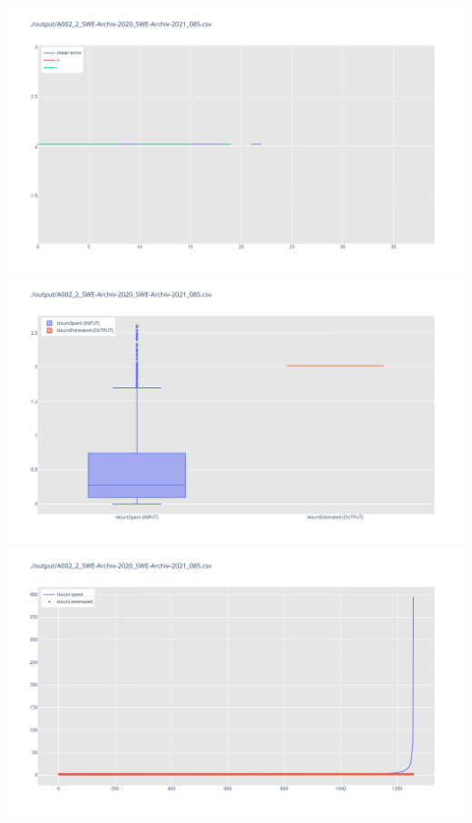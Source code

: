 \includegraphics[width=\textwidth]{Scripts/output/A002_2_SWE-Archiv-2020_SWE-Archiv-2021_085.csv.error_distribution.png}
\includegraphics[width=\textwidth]{Scripts/output/A002_2_SWE-Archiv-2020_SWE-Archiv-2021_085.csv.png}
\includegraphics[width=\textwidth]{Scripts/output/A002_2_SWE-Archiv-2020_SWE-Archiv-2021_085.csv.scatter.png}
